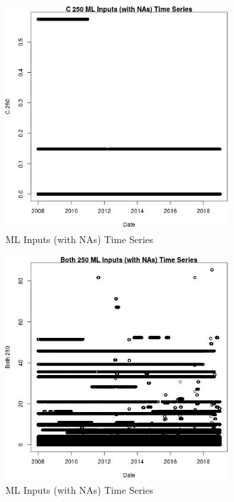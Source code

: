 \begin{figure} 
\centering  
\includegraphics[width=0.77\textwidth]{Code_Outputs/Report_ML_input_PM25_Step4_part_f_de_duplicated_aves_prioritize_24hr_obswNAs_C_250vDate.jpg} 
\caption{\label{fig:Report_ML_input_PM25_Step4_part_f_de_duplicated_aves_prioritize_24hr_obswNAsC_250vDate}ML Inputs (with NAs) Time Series} 
\end{figure} 
 

\begin{figure} 
\centering  
\includegraphics[width=0.77\textwidth]{Code_Outputs/Report_ML_input_PM25_Step4_part_f_de_duplicated_aves_prioritize_24hr_obswNAs_Both_250vDate.jpg} 
\caption{\label{fig:Report_ML_input_PM25_Step4_part_f_de_duplicated_aves_prioritize_24hr_obswNAsBoth_250vDate}ML Inputs (with NAs) Time Series} 
\end{figure} 
 

